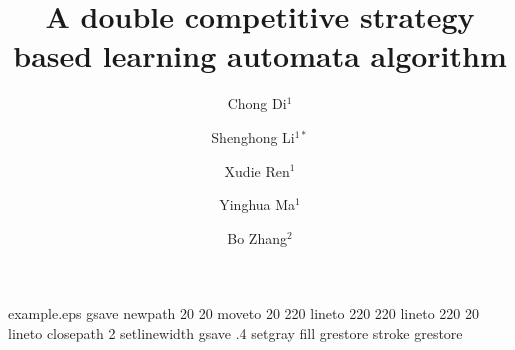 %
%
%
%
%
\begin{filecontents*}{example.eps}
gsave
newpath
  20 20 moveto
  20 220 lineto
  220 220 lineto
  220 20 lineto
closepath
2 setlinewidth
gsave
  .4 setgray fill
grestore
stroke
grestore
\end{filecontents*}
%
\RequirePackage{fix-cm}
%
\documentclass[smallcondensed]{svjour3}     %
%
\smartqed  %
%
\usepackage{graphicx}
\usepackage[pagewise]{lineno}


%
%
%
%
%

\title{A double competitive strategy based learning automata algorithm%
}


\author{Chong Di$^1$ \and Shenghong Li$^{1*}$ \and Xudie Ren$^1$ \and Yinghua Ma$^1$ \and Bo Zhang$^2$  %
}

